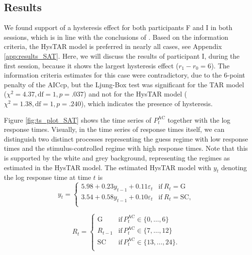\documentclass{article}
\begin{document}
\subsection{Results}
We found support of a hysteresis effect for both participants F and I in both sessions, which is in line with the conclusions of \citet{speedaccuracy}.
Based on the information criteria, the HysTAR model is preferred in nearly all cases, see Appendix \ref{app:results_SAT}.
Here, we will discuss the results of participant I, during the first session, because it shows the largest hysteresis effect ($r_1 - r_0 = 6$). 
The information criteria estimates for this case were contradictory, due to the 6-point penalty of the AICcp, 
but the Ljung-Box test was significant for the TAR model ($\chi^2 = 4.37, \text{df} = 1, p = .037$) and not for the HysTAR model ($\chi^2 = 1.38, \text{df} = 1, p = .240$), which indicates the presence of hysteresis.

Figure \ref{fig:ts_plot_SAT} shows the time series of $P^{\mathrm{AC}}_t$ together with the log response times.
Visually, in the time series of response times itself, we can distinguish two distinct processes representing the guess regime with low response times and the stimulus-controlled regime with high response times.
Note that this is supported by the white and grey background, representing the regimes as estimated in the HysTAR model.
The estimated HysTAR model with $y_t$ denoting the log response time at time $t$ is
\begin{equation}
y_t = 
\begin{cases}
5.98 + 0.23 y_{t-1} + 0.11 \varepsilon_t & \text{if}~R_{t} = \mathrm{G}\\
3.54 + 0.58 y_{t-1} + 0.10 \varepsilon_t & \text{if}~R_{t} = \mathrm{SC}, \\
\end{cases}
\end{equation}

\begin{equation} 
R_t = \begin{cases}
\mathrm{G} & \mathrm{if} \, P^{\mathrm{AC}}_{t} \in \{0, \dots, 6\} \\
R_{t-1} & \mathrm{if} \, P^{\mathrm{AC}}_{t} \in \{7, \dots, 12\} \\
\mathrm{SC} & \mathrm{if} \, P^{\mathrm{AC}}_{t} \in \{13, \dots, 24\}. \\
\end{cases}
\end{equation}
\end{document}
